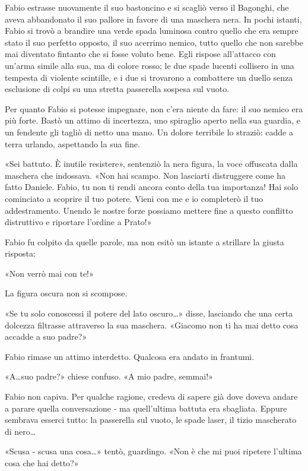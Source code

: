 Fabio estrasse nuovamente il suo bastoncino e si scagliò verso il Bagonghi, che aveva abbandonato il suo pallore in favore di una maschera nera. In pochi istanti, Fabio si trovò a brandire una verde spada luminosa contro quello che era sempre stato il suo perfetto opposto, il suo acerrimo nemico, tutto quello che non sarebbe mai diventato fintanto che si fosse voluto bene. Egli rispose all'attacco con un'arma simile alla sua, ma di colore rosso; le due spade lucenti collisero in una tempesta di violente scintille, e i due si trovarono a combattere un duello senza esclusione di colpi su una stretta passerella sospesa sul vuoto.

Per quanto Fabio si potesse impegnare, non c'era niente da fare: il suo nemico era più forte. Bastò un attimo di incertezza, uno spiraglio aperto nella sua guardia, e un fendente gli tagliò di netto una mano. Un dolore terribile lo straziò: cadde a terra urlando, aspettando la sua fine.

«Sei battuto. È inutile resistere», sentenziò la nera figura, la voce offuscata dalla maschera che indossava. «Non hai scampo. Non lasciarti distruggere come ha fatto Daniele. Fabio, tu non ti rendi ancora conto della tua importanza! Hai solo cominciato a scoprire il tuo potere. Vieni con me e io completerò il tuo addestramento. Unendo le nostre forze possiamo mettere fine a questo conflitto distruttivo e riportare l'ordine a Prato!»

Fabio fu colpito da quelle parole, ma non esitò un istante a strillare la giusta risposta:

«Non verrò mai con te!»

La figura oscura non si scompose.

«Se tu solo conoscessi il potere del lato oscuro\ldots» disse, lasciando che una certa dolcezza filtrasse attraverso la sua maschera. «Giacomo non ti ha mai detto cosa accadde a suo padre?»

Fabio rimase un attimo interdetto. Qualcosa era andato in frantumi.

«A\ldots suo padre?» chiese confuso. «A mio padre, semmai!»

Fabio non capiva. Per qualche ragione, credeva di sapere già dove doveva andare a parare quella conversazione - ma quell'ultima battuta era sbagliata. Eppure sembrava esserci tutto: la passerella sul vuoto, le spade laser, il tizio mascherato di nero\ldots

«Scusa - scusa una cosa\ldots» tentò, guardingo. «Non è che mi puoi ripetere l'ultima cosa che hai detto?»

